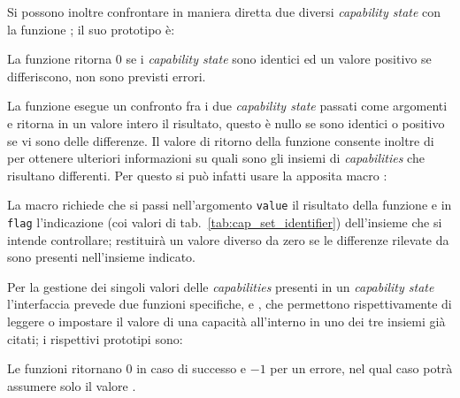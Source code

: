 Si possono inoltre confrontare in maniera diretta due diversi
\textit{capability state} con la funzione ; il suo
prototipo è:

\begin{funcproto}{
}

{La funzione ritorna $0$ se i \textit{capability state} sono identici
    ed un valore positivo se differiscono, non sono previsti errori.}
\end{funcproto}


La funzione esegue un confronto fra i due \textit{capability state} passati
come argomenti e ritorna in un valore intero il risultato, questo è nullo se
sono identici o positivo se vi sono delle differenze. Il valore di ritorno
della funzione consente inoltre di per ottenere ulteriori informazioni su
quali sono gli insiemi di \textit{capabilities} che risultano differenti.  Per
questo si può infatti usare la apposita macro :

{\centering
\vspace{3pt}
\begin{funcbox}{
}
\end{funcbox}
}

La macro richiede che si passi nell'argomento \texttt{value} il risultato
della funzione  e in \texttt{flag} l'indicazione (coi
valori di tab.~\ref{tab:cap_set_identifier}) dell'insieme che si intende
controllare; restituirà un valore diverso da zero se le differenze rilevate da
 sono presenti nell'insieme indicato.

Per la gestione dei singoli valori delle \textit{capabilities} presenti in un
\textit{capability state} l'interfaccia prevede due funzioni specifiche,
 e , che permettono
rispettivamente di leggere o impostare il valore di una capacità all'interno
in uno dei tre insiemi già citati; i rispettivi prototipi sono:

\begin{funcproto}{
}

{Le funzioni ritornano $0$ in caso di successo e $-1$ per un errore, nel qual
  caso  potrà assumere solo il valore .  
}
\end{funcproto}

